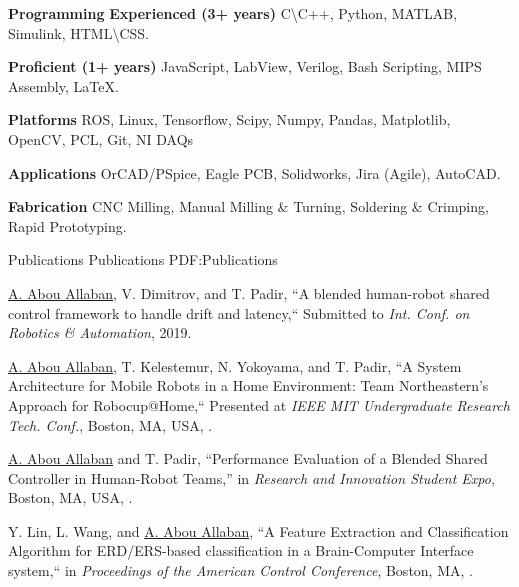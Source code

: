 \documentclass[letterpaper,MMMyyyy,nonstopmode]{simpleresumecv}
\begin{document}
\begin{Body}
\Entry
\textbf{Programming}
\BulletItem
\textbf{Experienced (3+ years)}
\newline
C\textbackslash C++, Python, MATLAB, Simulink, HTML\textbackslash CSS.

\BulletItem
\textbf{Proficient (1+ years)}
\newline
JavaScript,
LabView,
Verilog,
Bash Scripting,
MIPS Assembly,
{\LaTeX}.

\textbf{Platforms}
\newline
ROS, Linux, Tensorflow, Scipy, Numpy, Pandas, Matplotlib, OpenCV, PCL, Git, NI DAQs

\textbf{Applications}
\newline
OrCAD/PSpice, Eagle PCB, Solidworks, Jira (Agile), AutoCAD.

\textbf{Fabrication}
\newline
CNC Milling, Manual Milling \& Turning, Soldering \& Crimping, Rapid Prototyping.


\Section
{Publications}
{Publications}
{PDF:Publications}


\BigGap
\NumberedItem{[1]}
{\underline{A. Abou Allaban}, V. Dimitrov, and T. Padir, 
``A blended human-robot shared control framework to handle drift and latency,``
Submitted to \textit{Int. Conf. on Robotics \& Automation}, 2019.}

\Gap
\NumberedItem{[2]}
{\underline{A. Abou Allaban}, T. Kelestemur, N. Yokoyama, and T. Padir,
	``A System Architecture for Mobile Robots in a Home Environment: Team Northeastern’s Approach for Robocup@Home,``
	Presented at \textit{IEEE MIT Undergraduate Research Tech. Conf.}, 
	Boston, MA, USA,
	.}

\Gap
\NumberedItem{[3]}
{\underline{A. Abou Allaban} and T. Padir,
	``Performance Evaluation of a Blended Shared Controller in Human-Robot Teams,''
	in \textit{Research and Innovation Student Expo},
	Boston, MA, USA,
	.}

\Gap
\NumberedItem{[4]}
{Y. Lin, L. Wang, and \underline{A. Abou Allaban},
``A Feature Extraction and Classification Algorithm for ERD/ERS-based classification in a Brain-Computer Interface system,``
in \textit{Proceedings of the American Control Conference},
Boston, MA,
.}


\end{Body}
\end{document}
